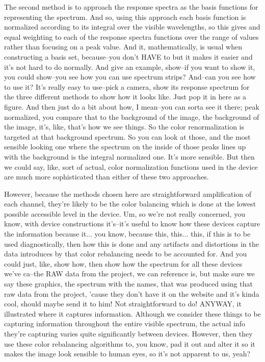The second method is to approach the response spectra as the basis functions for representing the spectrum. And so, using this approach each basis function is normalized according to its integral over the visible wavelengths, so this gives and equal weighting to each of the response spectra functions over the range of values rather than focusing on a peak value. And it, mathematically, is usual when constructing a basis set, because--you don't HAVE to but it makes it easier and it's not hard to do normally. And give an example, show--if you want to show it, you could show--you see how you can use spectrum strips? And--can you see how to use it? It's really easy to use--pick a camera, show its response spectrum for the three different methods to show how it looks like. Just pop it in here as a figure. And then just do a bit about how, I mean--you can sorta see it there; peak normalized, you compare that to the background of the image, the background of the image, it's, like, that's how we see things. So the color renormalization is targeted at that background spectrum. So you can look at those, and the most sensible looking one where the spectrum on the inside of those peaks lines up with the background is the integral normalized one. It's more sensible. But then we could say, like, sort of actual, color normalization functions used in the device are much more sophisticated than either of these two approaches. 

However, because the methods chosen here are straightforward amplification of each channel, they're likely to be the color balancing which is done at the lowest possible accessible level in the device. Um, so we're not really concerned, you know, with device constructions it's--it's useful to know how these devices capture the information because it... you know, because this, this... this, if this is to be used diagnostically, then how this is done and any artifacts and distortions in the data introduces by that color rebalancing needs to be accounted for. And you could just, like, show how, then show how the spectrum for all these devices we've ca--the RAW data from the project, we can reference is, but make sure we say these graphics, the spectrum with the names, that was produced using that raw data from the project, 'cause they don't have it on the website and it's kinda cool, should maybe send it to him! Not straightforward to do! ANYWAY, it illustrated where it captures information. Although we consider these things to be capturing information throughout the entire visible spectrum, the actual info they're capturing varies quite significantly between devices. However, then they use these color rebalancing algorithms to, you know, pad it out and alter it so it makes the image look sensible to human eyes, so it's not apparent to us, yeah? 

